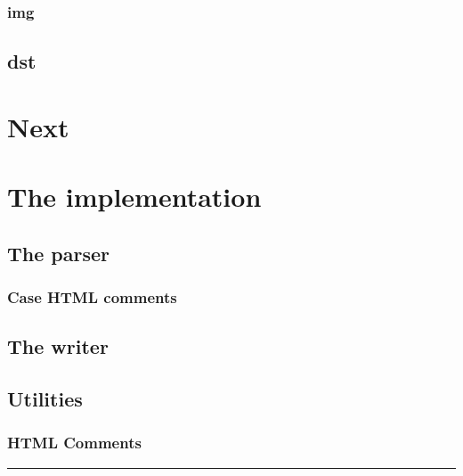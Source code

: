 \documentclass[a4paper, 11pt, titlepage, openany]{article}
\begin{document}
{}

{}

\subsubsection{{{ \fw img}}}

{}

\subsection{{{ \fw dst}}}

{}

\section{Next}

\section{The implementation}

\subsection{The parser}

\subsubsection{Case HTML comments}

\subsection{The writer}

\subsection{Utilities}

\subsubsection{HTML Comments}

\noindent\rule{\textwidth}{0.4pt}
\end{document}
